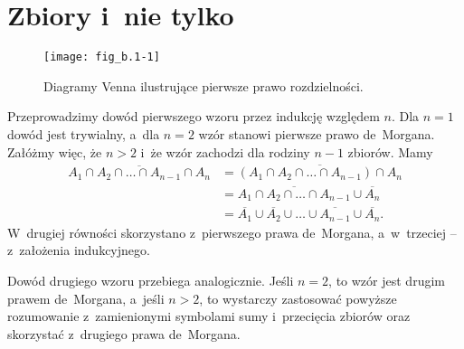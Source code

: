 \chapter{Zbiory i~nie tylko}


\exercise %
\begin{figure}[ht]
	\begin{center}
		\texttt{[image: fig\_b.1-1]}
	\end{center}
	\caption{Diagramy Venna ilustrujące pierwsze prawo rozdzielności.}
\end{figure}

\exercise %
Przeprowadzimy dowód pierwszego wzoru przez indukcję względem $n$.
Dla $n=1$ dowód jest trywialny, a~dla $n=2$ wzór stanowi pierwsze prawo de~Morgana.
Załóżmy więc, że $n>2$ i~że wzór zachodzi dla rodziny $n-1$ zbiorów.
Mamy
\begin{align*}
	\overline{A_1\cap A_2\cap\dots\cap A_{n-1}\cap A_n} &= \overline{(A_1\cap A_2\cap\dots\cap A_{n-1})\cap A_n} \\
	&= \overline{A_1\cap A_2\cap\dots\cap A_{n-1}}\cup\overline{A_n} \\
	&= \overline{A_1}\cup\overline{A_2}\cup\dots\cup\overline{A_{n-1}}\cup\overline{A_n}.
\end{align*}
W~drugiej równości skorzystano z~pierwszego prawa de~Morgana, a~w~trzeciej -- z~założenia indukcyjnego.

Dowód drugiego wzoru przebiega analogicznie.
Jeśli $n=2$, to wzór jest drugim prawem de~Morgana, a~jeśli $n>2$, to wystarczy zastosować powyższe rozumowanie z~zamienionymi symbolami sumy i~przecięcia zbiorów oraz skorzystać z~drugiego prawa de~Morgana.

